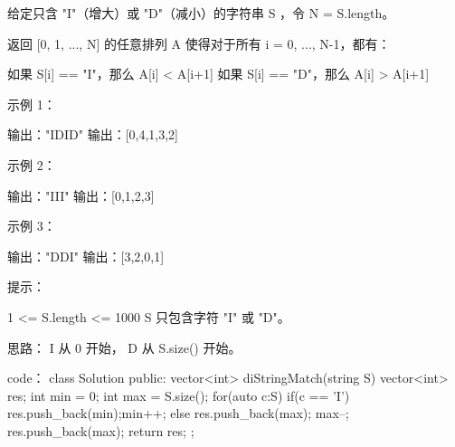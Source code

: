 给定只含 "I"（增大）或 "D"（减小）的字符串 S ，令 N = S.length。

返回 [0, 1, ..., N] 的任意排列 A 使得对于所有 i = 0, ..., N-1，都有：

    如果 S[i] == "I"，那么 A[i] < A[i+1]
    如果 S[i] == "D"，那么 A[i] > A[i+1]

 

示例 1：

输出："IDID"
输出：[0,4,1,3,2]

示例 2：

输出："III"
输出：[0,1,2,3]

示例 3：

输出："DDI"
输出：[3,2,0,1]

 

提示：

    1 <= S.length <= 1000
    S 只包含字符 "I" 或 "D"。



























思路：
I 从 0 开始， D 从 S.size() 开始。































code：
class Solution {
public:
    vector<int> diStringMatch(string S) {
        vector<int> res;
        int min = 0;
        int max = S.size();
        for(auto c:S)
        {
            if(c == 'I')
            {
                res.push_back(min);min++;
            }
            else 
            {
                res.push_back(max); max--;
            }
        }
        res.push_back(max);
        return res;
    }
};